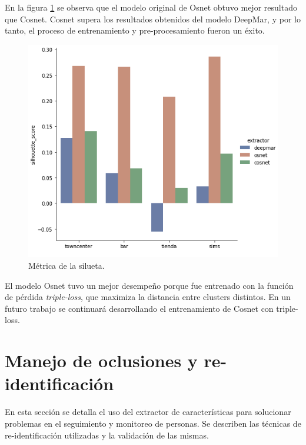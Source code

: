 \newpage

En la figura \ref{fig:comparacionExtractores} se observa que el modelo original de Osnet obtuvo mejor resultado que Cosnet. Cosnet supera los resultados obtenidos del modelo DeepMar, y por lo tanto, el proceso de entrenamiento y pre-procesamiento fueron un éxito.

\begin{figure}[ht]
	\centering
	\includegraphics[scale=1.]{./Figures/comparacionExtractores.png}
	\caption{Métrica de la silueta.}
	\label{fig:comparacionExtractores}
\end{figure}

El modelo Osnet tuvo un mejor desempeño porque fue entrenado con la función de pérdida \textit{triple-loss}, que maximiza la distancia entre clusters distintos. En un futuro trabajo se continuará desarrollando el entrenamiento de Cosnet con triple-loss.

\newpage


\section{Manejo de oclusiones y re-identificación}
\label{sec:oclusionesReID}

En esta sección se detalla el uso del extractor de características para solucionar problemas en el seguimiento y monitoreo de personas. Se describen las técnicas de re-identificación utilizadas y la validación de las mismas.


